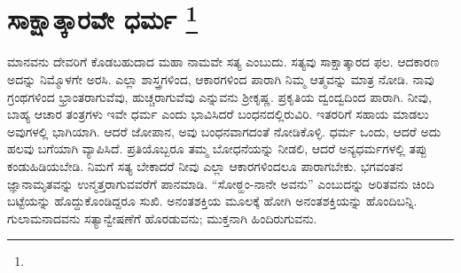 
\chapter[ಸಾಕ್ಷಾತ್ಕಾರವೇ ಧರ್ಮ ]{ಸಾಕ್ಷಾತ್ಕಾರವೇ ಧರ್ಮ \protect\footnote{}}

ಮಾನವನು ದೇವರಿಗೆ ಕೊಡಬಹುದಾದ ಮಹಾ ನಾಮವೇ ಸತ್ಯ ಎಂಬುದು. ಸತ್ಯವು ಸಾಕ್ಷಾತ್ಕಾರದ ಫಲ. ಆದಕಾರಣ ಅದನ್ನು ನಿಮ್ಮೊಳಗೇ ಅರಸಿ. ಎಲ್ಲಾ ಶಾಸ್ತ್ರಗಳಿಂದ, ಆಕಾರಗಳಿಂದ ಪಾರಾಗಿ ನಿಮ್ಮ ಆತ್ಮವನ್ನು ಮಾತ್ರ ನೋಡಿ. ನಾವು ಗ್ರಂಥಗಳಿಂದ ಭ್ರಾಂತರಾಗುವೆವು, ಹುಚ್ಚರಾಗುವೆವು ಎನ್ನುವನು ಶ‍್ರೀಕೃಷ್ಣ. ಪ್ರಕೃತಿಯ ದ್ವಂದ್ವದಿಂದ ಪಾರಾಗಿ. ನೀವು, ಬಾಹ್ಯ ಆಚಾರ ತಂತ್ರಗಳು ಇವೇ ಧರ್ಮ ಎಂದು ಭಾವಿಸಿದರೆ ಬಂಧನದಲ್ಲಿರುವಿರಿ. ಇತರರಿಗೆ ಸಹಾಯ ಮಾಡಲು ಅವುಗಳಲ್ಲಿ ಭಾಗಿಯಾಗಿ. ಆದರೆ ಜೋಪಾನ, ಅವು ಬಂಧನವಾಗದಂತೆ ನೋಡಿಕೊಳ್ಳಿ. ಧರ್ಮ ಒಂದು, ಆದರೆ ಅದು ಹಲವು ಬಗೆಯಾಗಿ ವ್ಯಾಪಿಸಿದೆ. ಪ್ರತಿಯೊಬ್ಬರೂ ತಮ್ಮ ಬೋಧನೆಯನ್ನು ನೀಡಲಿ, ಆದರೆ ಅನ್ಯಧರ್ಮಗಳಲ್ಲಿ ತಪ್ಪು ಕಂಡುಹಿಡಿಯಬೇಡಿ. ನಿಮಗೆ ಸತ್ಯ ಬೇಕಾದರೆ ನೀವು ಎಲ್ಲಾ ಆಕಾರಗಳಿಂದಲೂ ಪಾರಾಗಬೇಕು. ಭಗವಂತನ ಜ್ಞಾನಾಮೃತವನ್ನು ಉನ್ಮತ್ತರಾಗುವವರೆಗೆ ಪಾನಮಾಡಿ. “ಸೋಠ್ಹಂ-ನಾನೇ ಅವನು” ಎಂಬುದನ್ನು ಅರಿತವನು ಚಿಂದಿ ಬಟ್ಟೆಯನ್ನು ಹೊದ್ದುಕೊಂಡಿದ್ದರೂ ಸುಖಿ. ಅನಂತಶಕ್ತಿಯ ಮೂಲಕ್ಕೆ ಹೋಗಿ ಅನಂತಶಕ್ತಿಯನ್ನು ಹೊಂದಿಬನ್ನಿ. ಗುಲಾಮನಾದವನು ಸತ್ಯಾನ್ವೇಷಣೆಗೆ ಹೊರಡುವನು; ಮುಕ್ತನಾಗಿ ಹಿಂದಿರುಗುವನು.

